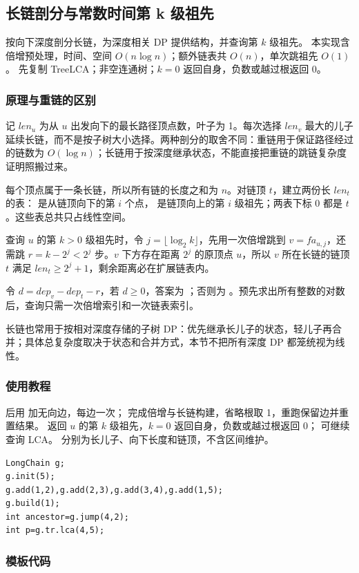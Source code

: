 \subsection{长链剖分与常数时间第 k 级祖先}
\label{tree:long-chain}
\AlgorithmInfo
    {按向下深度剖分长链，为深度相关 DP 提供结构，并查询第 $k$ 级祖先。}
    {本实现含倍增预处理，时间、空间 $O(n\log n)$；额外链表共 $O(n)$，单次跳祖先 $O(1)$。}
    {先复制 TreeLCA；非空连通树；$k=0$ 返回自身，负数或越过根返回 0。}
\subsubsection*{原理与重链的区别}
记 $len_u$ 为从 $u$ 出发向下的最长路径顶点数，叶子为 1。每次选择 $len_v$ 最大的儿子延续长链，而不是按子树大小选择。两种剖分的取舍不同：重链用于保证路径经过的链数为 $O(\log n)$；长链用于按深度继承状态，不能直接把重链的跳链复杂度证明照搬过来。

每个顶点属于一条长链，所以所有链的长度之和为 $n$。对链顶 $t$，建立两份长 $len_t$ 的表： 是从链顶向下的第 $i$ 个点， 是链顶向上的第 $i$ 级祖先；两表下标 0 都是 $t$。这些表总共只占线性空间。

查询 $u$ 的第 $k>0$ 级祖先时，令 $j=\lfloor\log_2 k\rfloor$，先用一次倍增跳到 $v=fa_{u,j}$，还需跳 $r=k-2^j<2^j$ 步。$v$ 下方存在距离 $2^j$ 的原顶点 $u$，所以 $v$ 所在长链的链顶 $t$ 满足 $len_t\ge2^j+1$，剩余距离必在扩展链表内。

令 $d=dep_v-dep_t-r$，若 $d\ge0$，答案为 ；否则为 。预先求出所有整数的对数后，查询只需一次倍增索引和一次链表索引。

长链也常用于按相对深度存储的子树 DP：优先继承长儿子的状态，轻儿子再合并；具体总复杂度取决于状态和合并方式，本节不把所有深度 DP 都笼统视为线性。
\subsubsection*{使用教程}
 后用  加无向边，每边一次； 完成倍增与长链构建，省略根取 1，重跑保留边并重置结果。 返回 $u$ 的第 $k$ 级祖先，$k=0$ 返回自身，负数或越过根返回 0； 可继续查询 LCA。 分别为长儿子、向下长度和链顶，不含区间维护。
\begin{lstlisting}[style=mtycpp,numbers=none]
LongChain g;
g.init(5);
g.add(1,2),g.add(2,3),g.add(3,4),g.add(1,5);
g.build(1);
int ancestor=g.jump(4,2);
int p=g.tr.lca(4,5);
\end{lstlisting}
\subsubsection*{模板代码}
